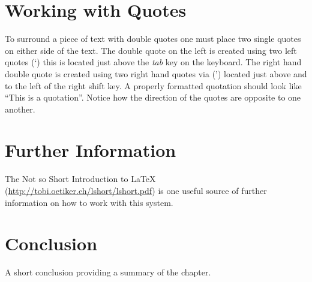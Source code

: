 \section{Working with Quotes}
To surround a piece of text with double quotes one must place two single quotes on either side of the text. The double quote on the left is created using two left quotes (\lq) this is located just above the \emph{tab} key on the keyboard. The right hand double quote is created using two right hand quotes via (\rq) located just above and to the left of the right shift key. A properly formatted quotation should look like ``This is a quotation''. Notice how the direction of the quotes are opposite to one another.

\section{Further Information}
The Not so Short Introduction to LaTeX (\url{http://tobi.oetiker.ch/lshort/lshort.pdf}) is one useful source of further information on how to work with this system.

\section{Conclusion}
A short conclusion providing a summary of the chapter.
